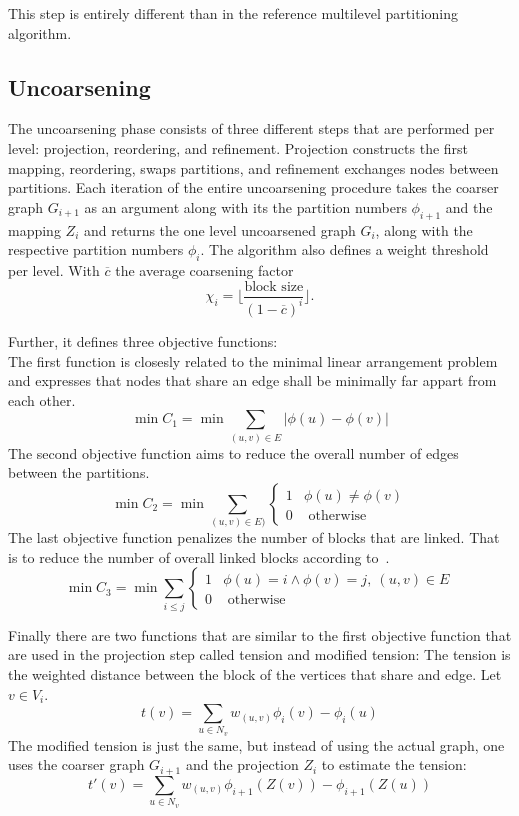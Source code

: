     This step is entirely different than in the reference multilevel partitioning algorithm.

    
    \subsection*{Uncoarsening}
    The uncoarsening phase consists of three different steps that are performed per level:
    projection, reordering, and refinement.
    Projection constructs the first mapping, reordering, swaps partitions, and refinement exchanges nodes between partitions.
    Each iteration of the entire uncoarsening procedure takes the coarser graph $G_{i+1}$ as an argument along with its the partition numbers $\phi_{i+1}$ and the mapping $Z_{i}$ and returns the one level uncoarsened graph $G_i$, along with the respective partition numbers $\phi_i$.
    The algorithm also defines a weight threshold per level. With $\overline{c}$ the average coarsening factor
    \[ \chi_i = \lfloor \frac{\text{block size}}{(1-\overline{c})^i} \rfloor. \]
    
    Further, it defines three objective functions:\\
    The first function is closesly related to the minimal linear arrangement problem~\autocite{lewis1983computers} and expresses that nodes that share an edge shall be minimally far appart from each other.
    \[ \min C_1 = \min \sum_{(u,v) \in E} |\phi(u) - \phi(v)| \]
    The second objective function aims to reduce the overall number of edges between the partitions.
    \[\min C_2 = \min \sum_{(u,v) \in E)} \begin{cases}
        1 & \phi(u) \neq \phi(v) \\
        0 & \text{ otherwise}
    \end{cases}
\]
    The last objective function penalizes the number of blocks that are linked. That is to reduce the number of overall linked blocks according to~\autocite{steinhaus2010g}.
    \[ \min C_3 = \min \sum_{i \leq j} 
    \begin{cases}
        1 & \phi(u) = i \wedge \phi(v) = j, \ (u,v) \in E \\
        0 & \text{ otherwise}
    \end{cases}
    \]
    
    Finally there are two functions that are similar to the first objective function that are used in the projection step called tension and modified tension:
    The tension is the weighted distance between the block of the vertices that share and edge. Let $v \in V_i$.
    \[ t(v) = \sum_{u \in N_v} w_{(u,v)} \phi_i(v) - \phi_i(u)\]
     The modified tension is just the same, but instead of using the actual graph, one uses the coarser graph $G_{i+1}$ and the projection $Z_{i}$ to estimate the tension:
     \[ t'(v) = \sum_{u \in N_v} w_{(u, v)} \phi_{i+1}(Z(v)) - \phi_{i+1}(Z(u)) \]
    
